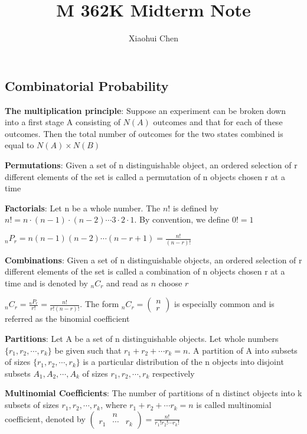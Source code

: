 \documentclass[12pt]{article}
\author{Xiaohui Chen}
\title{M 362K Midterm Note}
\begin{document}
\maketitle
\begin{spacing}{2.0}

\section{Combinatorial Probability}

\textbf{The multiplication principle}: Suppose an experiment can be broken down into a first stage A consisting of $N(A)$ outcomes and that for each of these outcomes. Then the total number of outcomes for the two states combined is equal to $N(A) \times N(B)$

\textbf{Permutations}: Given a set of n distinguishable object, an ordered selection of r different elements of the set is called a permutation of n objects chosen r at a time

\textbf{Factorials}: Let n be a whole number. The $n!$ is defined by $n!=n \cdot (n-1) \cdot (n-2) \cdots 3 \cdot 2 \cdot 1$. By convention, we define $0!=1$

${}_{n}P_{r}= n(n-1)(n-2) \cdots (n-r+1)= \frac{n!}{(n-r)!}$

\textbf{Combinations}: Given a set of n distinguishable objects, an ordered selection of r different elements of the set is called a combination of n objects chosen r at a time and is denoted by ${}_{n}C_{r}$ and read as $n$ choose $r$

${}_{n}C_{r} = \frac{{}_{n}P_{r}}{r!}= \frac{n!}{r!(n-r)!}$. The form ${}_{n}C_{r}= \left( \begin{array}{c}
n \\
r
\end{array}
\right)$ is especially common and is referred as the binomial coefficient

\textbf{Partitions}: Let A be a set of n distinguishable objects. Let whole numbers $\{ r_1, r_2, \cdots, r_k \}$ be given such that $r_1+r_2 + \cdots r_k=n$. A partition of A into subsets of sizes $\{ r_1, r_2, \cdots, r_k \}$ is a particular distribution of the n objects into disjoint subsets $A_1,A_2,\cdots, A_k$ of sizes $r_1, r_2, \cdots, r_k$ respectively

\textbf{Multinomial Coefficients}: The number of partitions of n distinct objects into k subsets of sizes $r_1, r_2, \cdots, r_k$, where $r_1+r_2 + \cdots r_k=n$ is called multinomial coefficient, denoted by $\left(
\begin{array}{ccc}
& n & \\
r_1 & \cdots & r_k
\end{array}
\right)= \frac{n!}{r_1!r_2! \cdots r_k!}$


\end{spacing}
\end{document}
